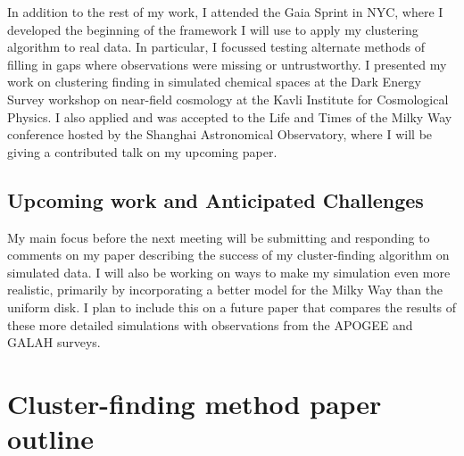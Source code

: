 \documentclass[11pt]{article}
\begin{document}
    In addition to the rest of my work, I attended the Gaia Sprint in NYC, where I developed the beginning of the framework I will use to apply my clustering algorithm to real data. In particular, I focussed testing alternate methods of filling in gaps where observations were missing or untrustworthy. I presented my work on clustering finding in simulated chemical spaces at the Dark Energy Survey workshop on near-field cosmology at the Kavli Institute for Cosmological Physics. I also applied and was accepted to the Life and Times of the Milky Way conference hosted by the Shanghai Astronomical Observatory, where I will be giving a contributed talk on my upcoming paper.
  
    
    \subsection*{Upcoming work and Anticipated Challenges}
    
    My main focus before the next meeting will be submitting and responding to comments on my paper describing the success of my cluster-finding algorithm on simulated data. I will also be working on ways to make my simulation even more realistic, primarily by incorporating a better model for the Milky Way than the uniform disk. I plan to include this on a future paper that compares the results of these more detailed simulations with observations from the APOGEE and GALAH surveys.
    
	
   
 
\section*{Cluster-finding method paper outline}
\end{document}
